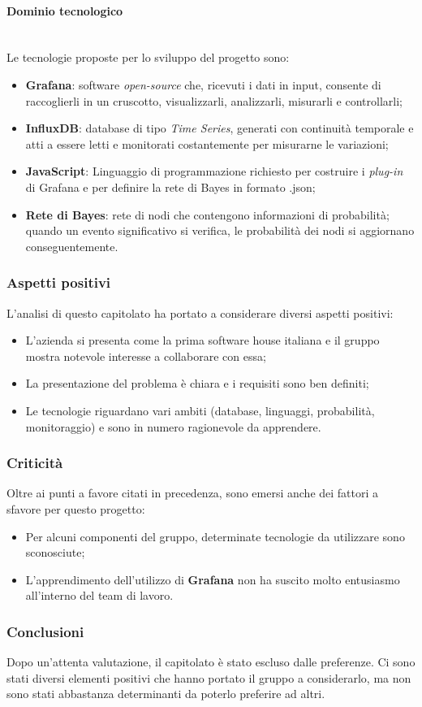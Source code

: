 \paragraph {Dominio tecnologico} \mbox{} \\
Le tecnologie proposte per lo sviluppo del progetto sono:
\begin{itemize}
	\item \textbf{Grafana}: software \textit{open-source} che, ricevuti i dati in input,
	 consente di raccoglierli in un cruscotto, visualizzarli, analizzarli, 
	 misurarli e controllarli;
	\item \textbf{InfluxDB}: database di tipo \textit{Time Series}, generati con continuità
	 temporale e atti a essere letti e monitorati costantemente per misurarne 
	 le variazioni;
	\item \textbf{JavaScript}: Linguaggio di programmazione richiesto per costruire i 
	\textit{plug-in} di Grafana e per definire la rete di Bayes in formato .json;
	\item \textbf{Rete di Bayes}: rete di nodi che contengono informazioni di probabilità;
	 quando un evento significativo si verifica, le probabilità dei nodi si aggiornano 
	 conseguentemente.
\end{itemize}
\subsubsection{Aspetti positivi}
L'analisi di questo capitolato ha portato a considerare diversi aspetti positivi:
\begin{itemize}
	\item L'azienda si presenta come la prima software house italiana e il gruppo mostra 
	notevole interesse a collaborare con essa;
	\item La presentazione del problema è chiara e i requisiti sono ben definiti;
	\item Le tecnologie riguardano vari ambiti (database, linguaggi, probabilità, 
	monitoraggio) e sono in numero ragionevole da apprendere.
\end{itemize}
\subsubsection{Criticità}
Oltre ai punti a favore citati in precedenza, sono emersi anche dei fattori a sfavore per
questo progetto:
\begin{itemize}
	\item Per alcuni componenti del gruppo, determinate tecnologie da  utilizzare 
	sono sconosciute;
	\item L'apprendimento dell'utilizzo di \textbf{Grafana} non ha suscito molto 
	entusiasmo all'interno del team di lavoro.
\end{itemize}
\subsubsection{Conclusioni}
Dopo un'attenta valutazione, il capitolato è stato escluso dalle preferenze. Ci sono stati diversi 
elementi positivi che hanno portato il gruppo a considerarlo, ma non sono stati abbastanza
determinanti da poterlo preferire ad altri.
